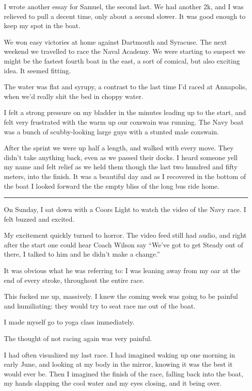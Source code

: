I wrote another essay for Samuel, the second last.  We had another 2k, and I was
relieved to pull a decent time, only about a second slower.  It was good enough
to keep my spot in the boat.

We won easy victories at home against Dartmouth and Syracuse.  The next weekend
we travelled to race the Naval Academy.  We were starting to suspect we might be
the fastest fourth boat in the east, a sort of comical, but also exciting idea.
It seemed fitting.  

The water was flat and syrupy, a contrast to the last time I'd raced at
Annapolis, when we'd really shit the bed in choppy water.  

I felt a strong pressure on my bladder in the minutes leading up to the start,
and felt very frustrated with the warm up our coxswain was running.  The Navy
boat was a bunch of scubby-looking large guys with a stunted male coxswain.

After the sprint we were up half a length, and walked with every move.  They
didn't take anything back, even as we passed their docks.  I heard someone yell
my name and felt relief as we held them though the last two hundred and fifty
meters, into the finish.  It was a beautiful day and as I recovered in the
bottom of the boat I looked forward the the empty bliss of the long bus ride
home.

\plainfancybreak{12pt}{2}{* * *}

On Sunday, I sat down with a Coors Light to watch the video of the Navy race.  I
felt buzzed and excited. 

My excitement quickly turned to horror.  The video feed still had audio, and
right after the start one could hear Coach Wilson say ``We've got to get Steady
out of there, I talked to him and he didn't make a change.''  

It was obvious what he was referring to: I was leaning away from my oar at the
end of every stroke, throughout the entire race.

This fucked me up, massively.  I knew the coming week was going to be painful and
humiliating: they would try to seat race me out of the boat.

I made myself go to yoga class immediately.  

The thought of not racing again was very painful.  

I had often visualized my last race.  I had imagined waking up one morning in
early June, and looking at my body in the mirror, knowing it was the best it
would ever be.  Then I imagined the finish of the race, falling back into the
boat, my hands slapping the cool water and my eyes closing, and it being over.


